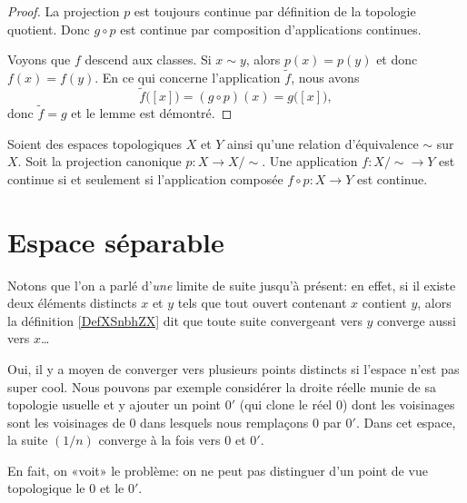 \begin{proof}
	La projection \( p\) est toujours continue par définition de la topologie quotient. Donc \( g\circ p\) est continue par composition d'applications continues.

	Voyons que \( f\) descend aux classes. Si \( x\sim y\), alors \( p(x)=p(y)\) et donc \( f(x)=f(y)\). En ce qui concerne l'application \( \tilde f\), nous avons
	\begin{equation}
		\tilde f\big( [x] \big)=(g\circ p)(x)=g\big( [x] \big),
	\end{equation}
	donc \( \tilde f=g\) et le lemme est démontré.
\end{proof}

\begin{proposition}       \label{PROPooYKLBooQuqnfA}
	Soient des espaces topologiques \( X\) et \( Y\) ainsi qu'une relation d'équivalence \( \sim\) sur \( X\). Soit la projection canonique \( p\colon X\to X/\sim\). Une application \( f\colon X/\sim\to Y\) est continue si et seulement si l'application composée \( f\circ p\colon X\to Y\) est continue.
\end{proposition}

\section{Espace séparable}

Notons que l'on a parlé d'\emph{une} limite de suite jusqu'à présent: en effet, si il existe deux éléments distincts \( x\) et \( y\) tels que tout ouvert contenant \( x\) contient \( y\), alors la définition \ref{DefXSnbhZX} dit que toute suite convergeant vers \( y\) converge aussi vers \( x\)\dots


\begin{example} \label{EXooSHKAooZQEVLB}
	Oui, il y a moyen de converger vers plusieurs points distincts si l'espace n'est pas super cool. Nous pouvons par exemple \cite{EJVQuas} considérer la droite réelle munie de sa topologie usuelle et y ajouter un point \( 0'\) (qui clone le réel \( 0\)) dont les voisinages sont les voisinages de \( 0\) dans lesquels nous remplaçons \( 0\) par \( 0'\). Dans cet espace, la suite \( (1/n)\) converge à la fois vers \( 0\) et \( 0'\).

	En fait, on «voit» le problème: on ne peut pas distinguer d'un point de vue topologique le \( 0\) et le \( 0'\).
\end{example}

